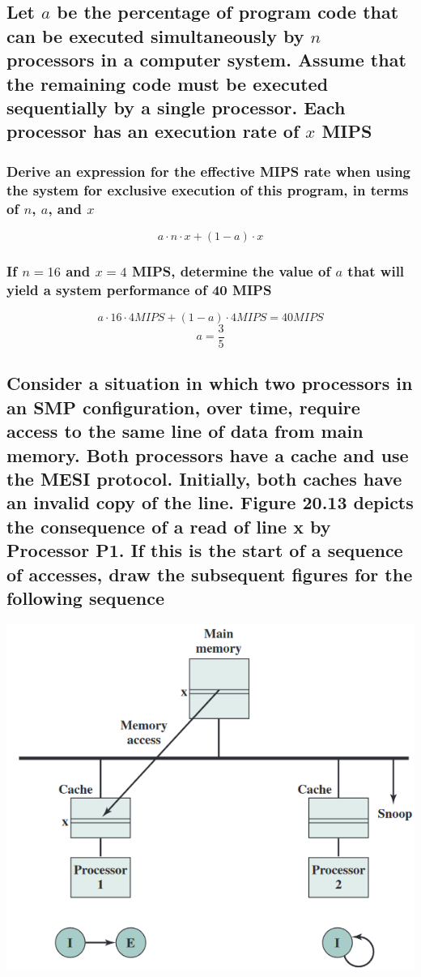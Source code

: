 \documentclass[12pt, a4paper]{article}
\begin{document}
		\subsection{Let $a$ be the percentage of program code that can be executed simultaneously by $n$ processors in a computer system. Assume that the remaining code must be executed sequentially by a single processor. Each processor has an execution rate of $x$ MIPS}
			\subsubsection{Derive an expression for the effective MIPS rate when using the system for exclusive execution of this program, in terms of $n$, $a$, and $x$}
				$$a\cdot n\cdot x+(1-a)\cdot x$$
			\subsubsection{If $n = 16$ and $x = 4$ MIPS, determine the value of $a$ that will yield a system performance of 40 MIPS}
				$$a\cdot 16 \cdot 4MIPS+(1-a)\cdot 4MIPS=40MIPS$$
				$$a=\frac{3}{5}$$
		\subsection{Consider a situation in which two processors in an SMP configuration, over time, require access to the same line of data from main memory. Both processors have a cache and use the MESI protocol. Initially, both caches have an invalid copy of the line. Figure 20.13 depicts the consequence of a read of line x by Processor P1. If this is the start of a sequence of accesses, draw the subsequent figures for the following
sequence}
			\includegraphics{assets/20.4.png}
\end{document}
